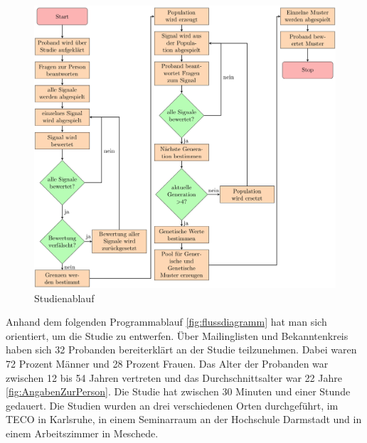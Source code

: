 


\begin{figure}
	\centering
    \includegraphics[width=\textwidth]{pics/analyse/Programmablaufdiagramm.png}
    \caption{Studienablauf}
    \label{fig:flussdiagramm}
\end{figure}

Anhand dem folgenden Programmablauf \autoref{fig:flussdiagramm} hat man sich orientiert, um die Studie zu entwerfen. 
{\"U}ber Mailinglisten und Bekanntenkreis haben sich 32 Probanden bereiterkl{\"a}rt an der Studie teilzunehmen. 
Dabei waren 72 Prozent M{\"a}nner und 28 Prozent Frauen. 
Das Alter der Probanden war zwischen 12 bis 54 Jahren vertreten und das Durchschnittsalter war 22 Jahre \autoref{fig:AngabenZurPerson}.  
Die Studie hat zwischen 30 Minuten und einer Stunde gedauert.
Die Studien wurden an drei verschiedenen Orten durchgef{\"u}hrt, im TECO in Karlsruhe, in einem Seminarraum an der Hochschule Darmstadt und in einem Arbeitszimmer in Meschede.

